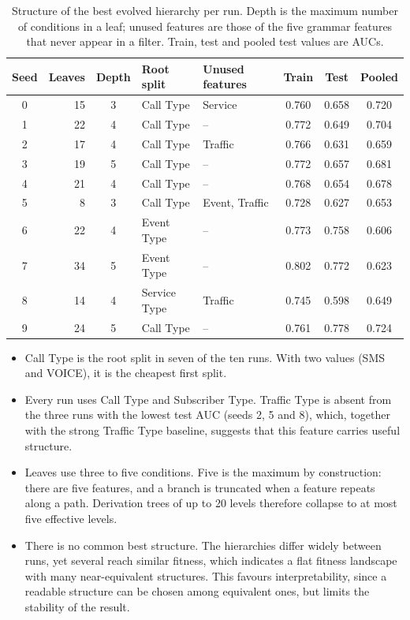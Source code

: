 \begin{table}[htbp]
    \centering
    \caption[Structure of the best evolved hierarchy per run]{Structure of the best evolved hierarchy per run. Depth is the maximum number of conditions in a leaf; unused features are those of the five grammar features that never appear in a filter. Train, test and pooled test values are \ac{AUC}s.}
    \label{tab:structure}
    \begin{tabular}{crcllccc}
        \toprule
        Seed & Leaves & Depth & Root split & Unused features & Train & Test & Pooled \\
        \midrule
        0 & 15 & 3 & Call Type & Service & 0.760 & 0.658 & 0.720 \\
        1 & 22 & 4 & Call Type & -- & 0.772 & 0.649 & 0.704 \\
        2 & 17 & 4 & Call Type & Traffic & 0.766 & 0.631 & 0.659 \\
        3 & 19 & 5 & Call Type & -- & 0.772 & 0.657 & 0.681 \\
        4 & 21 & 4 & Call Type & -- & 0.768 & 0.654 & 0.678 \\
        5 & 8 & 3 & Call Type & Event, Traffic & 0.728 & 0.627 & 0.653 \\
        6 & 22 & 4 & Event Type & -- & 0.773 & 0.758 & 0.606 \\
        7 & 34 & 5 & Event Type & -- & 0.802 & 0.772 & 0.623 \\
        8 & 14 & 4 & Service Type & Traffic & 0.745 & 0.598 & 0.649 \\
        9 & 24 & 5 & Call Type & -- & 0.761 & 0.778 & 0.724 \\
        \bottomrule
    \end{tabular}
\end{table}

\begin{itemize}
    \item Call Type is the root split in seven of the ten runs. With two values (SMS and VOICE), it is the cheapest first split.
    \item Every run uses Call Type and Subscriber Type. Traffic Type is absent from the three runs with the lowest test \ac{AUC} (seeds 2, 5 and 8), which, together with the strong Traffic Type baseline, suggests that this feature carries useful structure.
    \item Leaves use three to five conditions. Five is the maximum by construction: there are five features, and a branch is truncated when a feature repeats along a path. Derivation trees of up to 20 levels therefore collapse to at most five effective levels.
    \item There is no common best structure. The hierarchies differ widely between runs, yet several reach similar fitness, which indicates a flat fitness landscape with many near-equivalent structures. This favours interpretability, since a readable structure can be chosen among equivalent ones, but limits the stability of the result.
\end{itemize}

